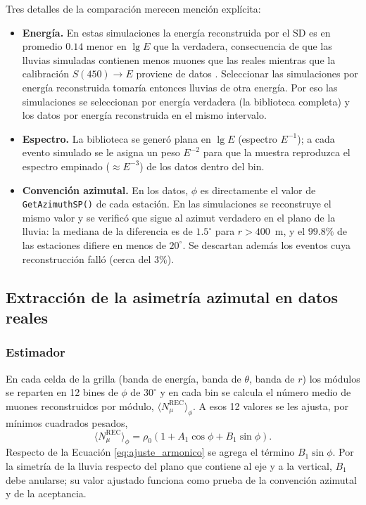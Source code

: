 Tres detalles de la comparación merecen mención explícita:
\begin{itemize}
	\item \textbf{Energía.} En estas simulaciones la energía reconstruida por el SD es en promedio $0.14$ menor en $\lg E$ que la verdadera, consecuencia de que las lluvias simuladas contienen menos muones que las reales mientras que la calibración $S(450) \rightarrow E$ proviene de datos \cite{auger2016muon_deficit}. Seleccionar las simulaciones por energía reconstruida tomaría entonces lluvias de otra energía. Por eso las simulaciones se seleccionan por energía verdadera (la biblioteca completa) y los datos por energía reconstruida en el mismo intervalo.
	\item \textbf{Espectro.} La biblioteca se generó plana en $\lg E$ (espectro $E^{-1}$); a cada evento simulado se le asigna un peso $E^{-2}$ para que la muestra reproduzca el espectro empinado ($\approx E^{-3}$) de los datos dentro del bin.
	\item \textbf{Convención azimutal.} En los datos, $\phi$ es directamente el valor de \texttt{GetAzimuthSP()} de cada estación. En las simulaciones se reconstruye el mismo valor y se verificó que sigue al azimut verdadero en el plano de la lluvia: la mediana de la diferencia es de $1.5^\circ$ para $r > 400$~m, y el $99.8\%$ de las estaciones difiere en menos de $20^\circ$. Se descartan además los eventos cuya reconstrucción falló (cerca del $3\%$).
\end{itemize}

\subsection{Extracción de la asimetría azimutal en datos reales}
\label{subsec:extraccion_asimetria}

\subsubsection{Estimador}

En cada celda de la grilla (banda de energía, banda de $\theta$, banda de $r$) los módulos se reparten en 12 bines de $\phi$ de $30^\circ$ y en cada bin se calcula el número medio de muones reconstruidos por módulo, $\langle N_\mu^\mathrm{REC} \rangle_\phi$. A esos 12 valores se les ajusta, por mínimos cuadrados pesados,
\begin{equation}
	\langle N_\mu^\mathrm{REC} \rangle_\phi = \rho_0 \left( 1 + A_1 \cos\phi + B_1 \sin\phi \right).
	\label{eq:ajuste_armonico_b1}
\end{equation}
Respecto de la Ecuación \ref{eq:ajuste_armonico} se agrega el término $B_1 \sin\phi$. Por la simetría de la lluvia respecto del plano que contiene al eje y a la vertical, $B_1$ debe anularse; su valor ajustado funciona como prueba de la convención azimutal y de la aceptancia.

